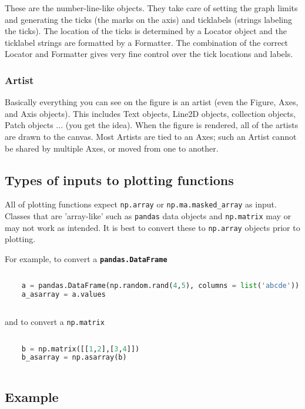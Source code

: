 These are the number-line-like objects. They take care of setting the graph limits and generating the ticks (the marks on the axis) and ticklabels (strings labeling the ticks). The location of the ticks is determined by a Locator object and the ticklabel strings are formatted by a Formatter. The combination of the correct Locator and Formatter gives very fine control over the tick locations and labels.

\subsubsection{Artist}

Basically everything you can see on the figure is an artist (even the Figure, Axes, and Axis objects). This includes Text objects, Line2D objects, collection objects, Patch objects ... (you get the idea). When the figure is rendered, all of the artists are drawn to the canvas. Most Artists are tied to an Axes; such an Artist cannot be shared by multiple Axes, or moved from one to another.

\subsection{Types of inputs to plotting functions}

All of plotting functions expect \texttt{np.array} or \texttt{np.ma.masked\_array} as input. Classes that are 'array-like' such as \texttt{pandas} data objects and \texttt{np.matrix} may or may not work as intended. It is best to convert these to \texttt{np.array} objects prior to plotting.

For example, to convert a \texttt{\textbf{pandas.DataFrame}}

\begin{lstlisting}[language=Python]
	
	a = pandas.DataFrame(np.random.rand(4,5), columns = list('abcde'))
	a_asarray = a.values
		
\end{lstlisting}

and to convert a \texttt{np.matrix}

\begin{lstlisting}[language=Python]
	
	b = np.matrix([[1,2],[3,4]])
	b_asarray = np.asarray(b)
	
\end{lstlisting}

\subsection{Example}

